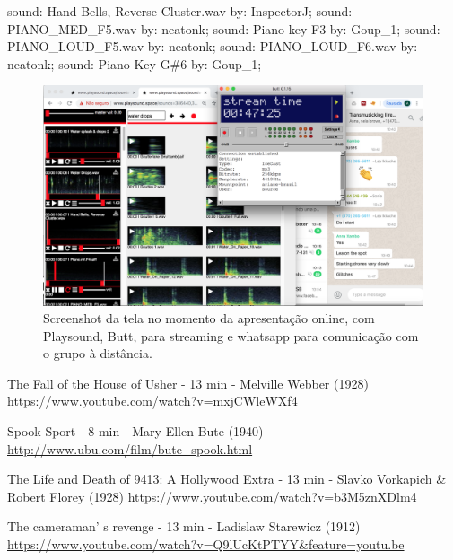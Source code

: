sound: Hand Bells, Reverse Cluster.wav by: InspectorJ; sound: PIANO\_MED\_F5.wav by: neatonk; sound: Piano key F3 by: Goup\_1; sound: PIANO\_LOUD\_F5.wav by: neatonk; sound: PIANO\_LOUD\_F6.wav by: neatonk; sound: Piano Key G\#6 by: Goup\_1;

\begin{figure}


\includegraphics[width=0.7\linewidth]{pictures/cap4/telasarc}
\caption{Screenshot da tela no momento da apresentação online, com Playsound, Butt, para streaming e whatsapp para comunicação com o grupo à distância.}
\label{telasarc}
\end{figure}






The Fall of the House of Usher  - 13 min - Melville Webber (1928)
\url{https://www.youtube.com/watch?v=mxjCWleWXf4}

Spook Sport - 8 min - Mary Ellen Bute (1940)
\url{http://www.ubu.com/film/bute_spook.html}

The Life and Death of 9413: A Hollywood Extra - 13  min - Slavko Vorkapich \& Robert Florey (1928)
\url{https://www.youtube.com/watch?v=b3M5znXDlm4}

The cameraman' s revenge  - 13 min - Ladislaw Starewicz (1912)
\url{https://www.youtube.com/watch?v=Q9lUcKtPTYY&feature=youtu.be}




